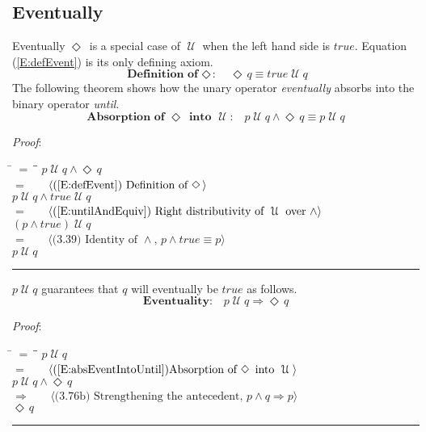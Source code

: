 \documentclass[12pt, fleqn, leqno]{article}
\newcommand{\lgap}{2pt}                             %
\newcommand{\mymathindent}{24pt}                    %
\newcommand{\impl}{\ensuremath{\Rightarrow}}        %
\newcommand{\Until}{\;\mathcal{U}\;}
\newcommand{\Event}{\Diamond\,}
\newcommand{\myqed}{\rule[-.23ex]{1.2ex}{2.0ex}}
\newcommand{\myqedtab}{\hspace{384pt}}              %
\newcommand{\Gll} {\langle}                         %
\newcommand{\Ggg} {\rangle}                         %
\newcommand{\Hint}[1]     {\ \ \ $\Gll              \mbox{#1} \Ggg$ }   %
\begin{document}
\subsection{Eventually}\label{section-event}

Eventually $\Event$ is a special case of $\Until$ when the left hand side is $true$.
Equation (\ref{E:defEvent}) is its only defining axiom.
\begin{equation}\label{E:defEvent}
\textbf{Definition of $\Event$:}\quad \Event q \equiv true \Until q
\end{equation}
The following theorem shows how the unary operator \textit{eventually} absorbs into the binary operator \textit{until}.
\begin{equation}\label{E:absEventIntoUntil}
\textbf{Absorption of $\Event$ into $\Until$:}\quad p \Until q\land \Event q \equiv p\Until q
\end{equation}

\emph{Proof}:
\begin{tabbing}
\hspace{\mymathindent} \= $= \;$ \= \myqedtab \= \kill
  \> \>   $p \Until q\land \Event q$\\[\lgap]
  \> $=$  \>  \Hint{(\ref{E:defEvent}) Definition of $\Event$}\\[\lgap]
  \> \>   $p \Until q\land true\Until q$\\[\lgap]
  \> $=$  \>  \Hint{(\ref{E:untilAndEquiv}) Right distributivity of $\Until$ over $\land$}\\[\lgap]
  \> \>   $(p\land true) \Until q$\\[\lgap]
  \> $=$  \>  \Hint{(3.39) Identity of $\land$, $p\land true\equiv p$}\\[\lgap]
  \> \>   $p\Until q$ \quad \myqed
\end{tabbing}

$p\Until q$ guarantees that $q$ will eventually be $true$ as follows.
\begin{equation}\label{E:eventuality}
\textbf{Eventuality:}\quad p \Until q \impl \Event q
\end{equation}

\emph{Proof}:
\begin{tabbing}
\hspace{\mymathindent} \= $= \;$ \= \myqedtab \= \kill
  \> \>   $p \Until q$\\[\lgap]
  \> $=$  \>  \Hint{(\ref{E:absEventIntoUntil})Absorption of $\Event$ into $\Until$}\\[\lgap]
  \> \>   $p \Until q \land \Event q$\\[\lgap]
  \> $\impl$  \>  \Hint{(3.76b) Strengthening the antecedent, $p\land q \impl p$}\\[\lgap]
  \> \>   $\Event q$ \quad \myqed
\end{tabbing}
\end{document}
